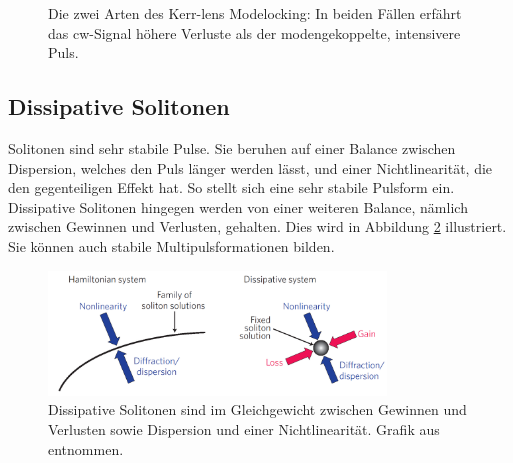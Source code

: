 \documentclass[bachelor,       %
               twoside,        %
               BCOR10mm,       %
               liststotoc,nomtotoc,bibtotoc, %
               english,ngerman, %
               final,          %
               ]{GAUBM}
\begin{document}
\begin{figure}[!htb]
   \centering
   \hfill
   \caption{Die zwei Arten des Kerr-lens Modelocking\protect\footnotemark: In beiden Fällen erfährt das cw-Signal höhere Verluste als der modengekoppelte, intensivere Puls.}
   \label{fig:KLM}
\end{figure}

\subsection{Dissipative Solitonen}
Solitonen sind sehr stabile Pulse.
Sie beruhen auf einer Balance zwischen Dispersion, welches den Puls länger werden lässt, und einer Nichtlinearität, die den gegenteiligen Effekt hat.
So stellt sich eine sehr stabile Pulsform ein.
Dissipative Solitonen hingegen werden von einer weiteren Balance, nämlich zwischen Gewinnen und Verlusten, gehalten.
Dies wird in Abbildung \ref{fig:DissipativeSoliton} illustriert.
Sie können auch stabile Multipulsformationen bilden.

\cite{grelu_dissipative_2012}
\cite{ankiewicz_dissipative_2008}


\begin{figure}[!htb]
	\centering
	\includegraphics[width=0.8\textwidth]{figures/dissipativeSoliton2}
	\caption{Dissipative Solitonen sind im Gleichgewicht zwischen Gewinnen und Verlusten sowie Dispersion und einer Nichtlinearität. Grafik aus \cite{grelu_dissipative_2012} entnommen.}
	\label{fig:DissipativeSoliton}
\end{figure}
\end{document}
